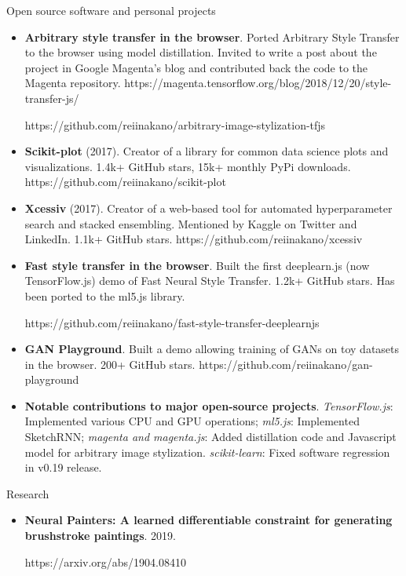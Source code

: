 \documentclass[]{mcdowellcv}
\begin{document}
	\begin{cvsection}{Open source software and personal projects}
		\begin{cvsubsection}{}{}{}
			\begin{itemize}
			    \item \textbf{Arbitrary style transfer in the browser}. Ported Arbitrary Style Transfer to the browser using model distillation. Invited to write a post about the project in Google Magenta's blog and contributed back the code to the Magenta repository. https://magenta.tensorflow.org/blog/2018/12/20/style-transfer-js/
			    
			    https://github.com/reiinakano/arbitrary-image-stylization-tfjs 
			    \item \textbf{Scikit-plot} (2017). Creator of a library for common data science plots and visualizations. 1.4k+ GitHub stars, 15k+ monthly PyPi downloads. https://github.com/reiinakano/scikit-plot
				\item \textbf{Xcessiv} (2017). Creator of a web-based tool for automated hyperparameter search and stacked ensembling. Mentioned by Kaggle on Twitter and LinkedIn. 1.1k+ GitHub stars. https://github.com/reiinakano/xcessiv
				\item \textbf{Fast style transfer in the browser}. Built the first deeplearn.js (now TensorFlow.js) demo of Fast Neural Style Transfer. 1.2k+ GitHub stars. Has been ported to the ml5.js library. 
				
				https://github.com/reiinakano/fast-style-transfer-deeplearnjs
				\item \textbf{GAN Playground}. Built a demo allowing training of GANs on toy datasets in the browser. 200+ GitHub stars. https://github.com/reiinakano/gan-playground
				\item \textbf{Notable contributions to major open-source projects}. \textit{TensorFlow.js}: Implemented various CPU and GPU operations; \textit{ml5.js}: Implemented SketchRNN; \textit{magenta and magenta.js}: Added distillation code and Javascript model for arbitrary image stylization. \textit{scikit-learn}: Fixed software regression in v0.19 release.
			\end{itemize}
		\end{cvsubsection}
	\end{cvsection}
	
	\begin{cvsection}{Research}
	   \begin{cvsubsection}{}{}{}
	      \begin{itemize}
	          \item \textbf{Neural Painters: A learned differentiable constraint for generating brushstroke paintings}. 2019. 
	          
	          https://arxiv.org/abs/1904.08410
	      \end{itemize}
	   \end{cvsubsection}
	\end{cvsection}
	
\end{document}
